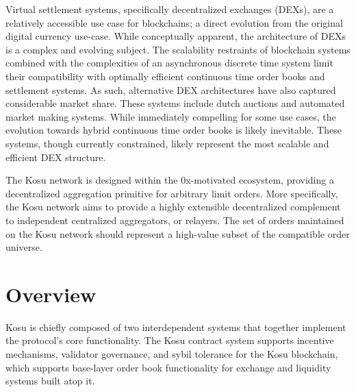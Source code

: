 \documentclass[10pt]{article}
\begin{document}
Virtual settlement systems, specifically decentralized exchanges (DEXs), are a relatively accessible use case for blockchains; a direct evolution from the original digital currency use-case. While conceptually apparent, the architecture of DEXs is a complex and evolving subject. The scalability restraints of blockchain systems combined with the complexities of an asynchronous discrete time system limit their compatibility with optimally efficient continuous time order books and settlement systems. As such, alternative DEX architectures have also captured considerable market share. These systems include dutch auctions and automated market making systems. While immediately compelling for some use cases, the evolution towards hybrid continuous time order books is likely inevitable. These systems, though currently constrained, likely represent the most scalable and efficient DEX structure.
\medskip

The Kosu network is designed within the 0x-motivated ecosystem, providing a decentralized aggregation primitive for arbitrary limit orders. More specifically, the Kosu network aims to provide a highly extensible decentralized complement to independent centralized aggregators, or relayers. The set of orders maintained on the Kosu network should represent a high-value subset of the compatible order universe.

\clearpage
\pagebreak


\section{Overview}\label{overview}

Kosu is chiefly composed of two interdependent systems that together implement the protocol’s core functionality. The Kosu contract system supports incentive mechanisms, validator governance, and sybil tolerance for the Kosu blockchain, which supports base-layer order book functionality for exchange and liquidity systems built atop it.

\medskip
\end{document}
